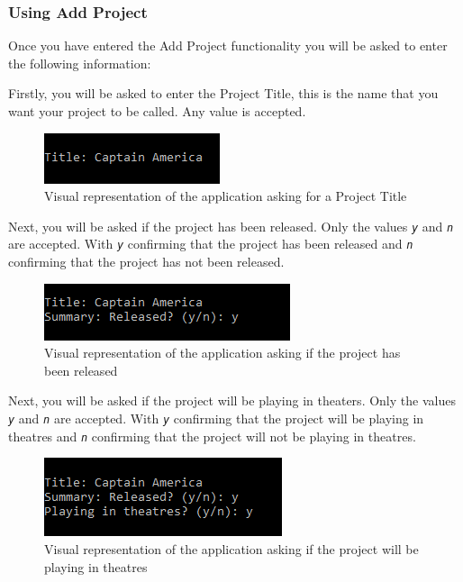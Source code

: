 \documentclass[
  english,
  a4paper,
,tablecaptionabove
]{scrartcl}
\begin{document}
\newpage

\hypertarget{using-add-project}{%
\subsubsection{Using Add Project}\label{using-add-project}}

Once you have entered the Add Project functionality you will be asked to
enter the following information:

Firstly, you will be asked to enter the Project Title, this is the name
that you want your project to be called. Any value is accepted.

\begin{figure}
\centering
\includegraphics{images/user-guide/maintenance-mode/add-project-title.png}
\caption{Visual representation of the application asking for a Project
Title}
\end{figure}

Next, you will be asked if the project has been released. Only the
values \emph{\texttt{y}} and \emph{\texttt{n}} are accepted. With
\emph{\texttt{y}} confirming that the project has been released and
\emph{\texttt{n}} confirming that the project has not been released.

\begin{figure}
\centering
\includegraphics{images/user-guide/maintenance-mode/add-project-released.png}
\caption{Visual representation of the application asking if the project
has been released}
\end{figure}

Next, you will be asked if the project will be playing in theaters. Only
the values \emph{\texttt{y}} and \emph{\texttt{n}} are accepted. With
\emph{\texttt{y}} confirming that the project will be playing in
theatres and \emph{\texttt{n}} confirming that the project will not be
playing in theatres.

\begin{figure}
\centering
\includegraphics{images/user-guide/maintenance-mode/add-project-theatres.png}
\caption{Visual representation of the application asking if the project
will be playing in theatres}
\end{figure}
\end{document}
